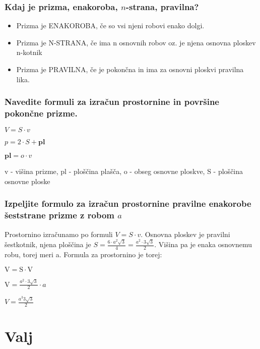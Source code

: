 \documentclass{article}
\begin{document}
\subsubsection*{Kdaj je prizma, enakoroba, $n$-strana, pravilna?}

\begin{itemize}

  \item Prizma je ENAKOROBA, če so vsi njeni robovi enako dolgi.

  \item Prizma je N-STRANA, če ima n osnovnih robov oz. je njena osnovna ploskev n-kotnik

  \item Prizma je PRAVILNA, če je pokončna in ima za osnovni ploskvi pravilna lika.
\end{itemize}



\subsubsection*{Navedite formuli za izračun prostornine in površine pokončne prizme.}

$V=S \cdot v$

$p=2 \cdot S+\mathbf{p l}$

$\mathbf{p l}=o \cdot v$

v - višina prizme, pl - ploščina plašča, o - obseg osnovne ploskve, S - ploščina osnovne ploske

\subsubsection*{Izpeljite formulo za izračun prostornine pravilne enakorobe šeststrane prizme z robom $a$}

Prostornino izračunamo po formuli $V=S \cdot v$. Osnovna ploskev je pravilni šestkotnik, njena ploščina je $S=\frac{6 \cdot a^{2} \sqrt{3}}{4}=\frac{a^{2} \cdot 3 \sqrt{3}}{2}$. Višina pa je enaka osnovnemu robu, torej meri a. Formula za prostornino je torej:

$\mathrm{V}=\mathrm{S} \cdot \mathrm{V}$

$\mathrm{V}=\frac{a^{2} \cdot 3 \sqrt{3}}{2} \cdot a$

$V=\frac{a^{3} 3 \sqrt{3}}{2}$ 

\section{Valj}
\end{document}
